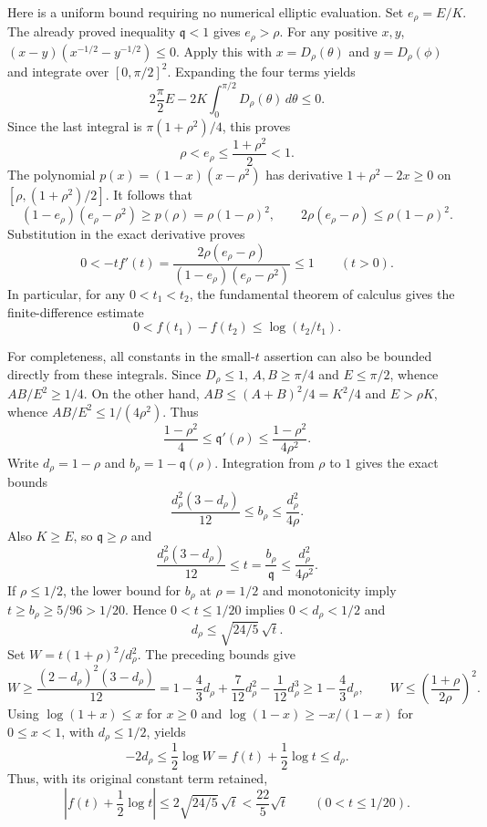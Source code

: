 \documentclass[11pt,a4paper]{article}
\begin{document}
Here is a uniform bound requiring no numerical elliptic evaluation.
Set $e_\rho=E/K$. The already proved inequality $\mathfrak q<1$ gives $e_\rho>\rho$.
For any positive $x,y$, $(x-y)(x^{-1/2}-y^{-1/2})\le0$.
Apply this with $x=D_\rho(\theta)$ and $y=D_\rho(\phi)$ and
integrate over $[0,\pi/2]^2$. Expanding the four terms yields
\[
 2\frac\pi2 E-2K\int_0^{\pi/2}D_\rho(\theta)\,d\theta\le0.
\]
Since the last integral is $\pi(1+\rho^2)/4$, this proves
\[
 \rho<e_\rho\le\frac{1+\rho^2}{2}<1.
\]
The polynomial $p(x)=(1-x)(x-\rho^2)$ has derivative
$1+\rho^2-2x\ge0$ on $[\rho,(1+\rho^2)/2]$.
It follows that
\[
 (1-e_\rho)(e_\rho-\rho^2)\ge p(\rho)=\rho(1-\rho)^2,
 \qquad 2\rho(e_\rho-\rho)\le\rho(1-\rho)^2.
\]
Substitution in the exact derivative proves
\[
 \boxed{0<-t f'(t)
 =\frac{2\rho(e_\rho-\rho)}{(1-e_\rho)(e_\rho-\rho^2)}\le1\qquad(t>0).}
\]
In particular, for any $0<t_1<t_2$, the fundamental theorem of calculus
gives the finite-difference estimate
\[
 0<f(t_1)-f(t_2)\le\log(t_2/t_1).
\]

For completeness, all constants in the small-$t$ assertion can also
be bounded directly from these integrals. Since $D_\rho\le1$,
$A,B\ge\pi/4$ and $E\le\pi/2$, whence $AB/E^2\ge1/4$.
On the other hand, $AB\le(A+B)^2/4=K^2/4$ and $E>\rho K$,
whence $AB/E^2\le1/(4\rho^2)$. Thus
\[
 \frac{1-\rho^2}{4}\le \mathfrak q'(\rho)
 \le\frac{1-\rho^2}{4\rho^2}.
\]
Write $d_\rho=1-\rho$ and $b_\rho=1-\mathfrak q(\rho)$.
Integration from $\rho$ to $1$ gives the exact bounds
\[
 \frac{d_\rho^2(3-d_\rho)}{12}\le b_\rho
 \le\frac{d_\rho^2}{4\rho}.
\]
Also $K\ge E$, so $\mathfrak q\ge\rho$ and
\[
 \frac{d_\rho^2(3-d_\rho)}{12}\le t=\frac{b_\rho}{\mathfrak q}
 \le\frac{d_\rho^2}{4\rho^2}.
\]
If $\rho\le1/2$, the lower bound for $b_\rho$ at $\rho=1/2$ and
monotonicity imply $t\ge b_\rho\ge5/96>1/20$.
Hence $0<t\le1/20$ implies $0<d_\rho<1/2$ and
\[
 d_\rho\le\sqrt{24/5}\,\sqrt t.
\]
Set $W=t(1+\rho)^2/d_\rho^2$. The preceding bounds give
\[
 W\ge\frac{(2-d_\rho)^2(3-d_\rho)}{12}
 =1-\frac43d_\rho+\frac7{12}d_\rho^2-\frac1{12}d_\rho^3
 \ge1-\frac43d_\rho,
 \qquad
 W\le\left(\frac{1+\rho}{2\rho}\right)^2.
\]
Using $\log(1+x)\le x$ for $x\ge0$ and
$\log(1-x)\ge-x/(1-x)$ for $0\le x<1$, with
$d_\rho\le1/2$, yields
\[
 -2d_\rho\le\frac12\log W
 =f(t)+\frac12\log t\le d_\rho.
\]
Thus, with its original constant term retained,
\[
 \boxed{
 \left|f(t)+\frac12\log t\right|
 \le2\sqrt{24/5}\,\sqrt t<\frac{22}{5}\sqrt t
 \qquad(0<t\le1/20).}
\]
\end{document}
